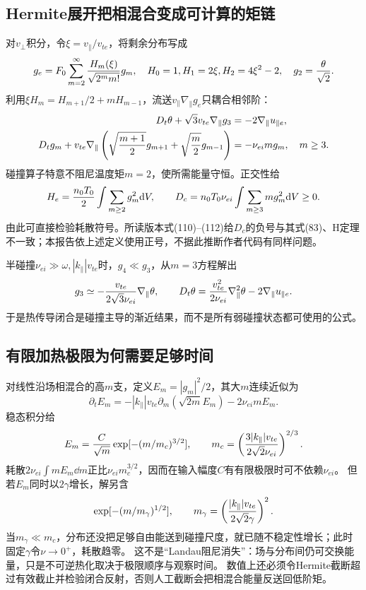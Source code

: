 \documentclass[UTF8,a4paper,11pt,openany,fontset=fandol]{ctexbook}
\begin{document}
\subsection{Hermite展开把相混合变成可计算的矩链}
对$v_\perp$积分，令$\xi=v_\parallel/v_{te}$，将剩余分布写成
\begin{equation}
 g_e=F_0\sum_{m=2}^{\infty}{H_m(\xi)\over\sqrt{2^m m!}}g_m,
 \quad H_0=1, H_1=2\xi, H_2=4\xi^2-2,\quad g_2={\theta\over\sqrt2}.
\end{equation}
利用$\xi H_m=H_{m+1}/2+mH_{m-1}$，流送$v_\parallel\nabla_\parallel g_e$只耦合相邻阶：
\begin{align}
 D_t\theta+\sqrt3v_{te}\nabla_\parallel g_3&=-2\nabla_\parallel u_{\parallel e},\\
 D_tg_m+v_{te}\nabla_\parallel\left(\sqrt{{m+1\over2}}g_{m+1}
 +\sqrt{{m\over2}}g_{m-1}\right)&=-\nu_{ei}m g_m,\quad m\ge3.
\end{align}
碰撞算子特意不阻尼温度矩$m=2$，使所需能量守恒。正交性给
\begin{equation}
 H_e={n_0T_0\over2}\int\sum_{m\ge2}g_m^2\mathrm d V,\qquad
 D_c=n_0T_0\nu_{ei}\int\sum_{m\ge3}m g_m^2\mathrm d V\ge0.
\end{equation}
由此可直接检验耗散符号。所读版本式(110)--(112)给$D_c$的负号与其式(83)、H定理不一致；本报告依上述定义使用正号，不据此推断作者代码有同样问题。

半碰撞$\nu_{ei}\gg\omega,|k_\parallel|v_{te}$时，$g_4\ll g_3$，从$m=3$方程解出
\begin{equation}
 g_3\simeq-{v_{te}\over2\sqrt3\nu_{ei}}\nabla_\parallel\theta,\qquad
 D_t\theta={v_{te}^2\over2\nu_{ei}}\nabla_\parallel^2\theta-2\nabla_\parallel u_{\parallel e}.
\end{equation}
于是热传导闭合是碰撞主导的渐近结果，而不是所有弱碰撞状态都可使用的公式。

\subsection{有限加热极限为何需要足够时间}
对线性沿场相混合的高$m$支，定义$E_m=|g_m|^2/2$，其大$m$连续近似为
\begin{equation}
 \partial_tE_m=-|k_\parallel|v_{te}\partial_m(\sqrt{2m}E_m)-2\nu_{ei}mE_m.
\end{equation}
稳态积分给
\begin{equation}
 E_m={C\over\sqrt m}\exp[-(m/m_c)^{3/2}],\qquad
 m_c=\left({3|k_\parallel|v_{te}\over2\sqrt2\nu_{ei}}\right)^{2/3}.
\end{equation}
耗散$2\nu_{ei}\int mE_m\dd m$正比$\nu_{ei}m_c^{3/2}$，因而在输入幅度$C$有有限极限时可不依赖$\nu_{ei}$。
但若$E_m$同时以$2\gamma$增长，解另含
\begin{equation}
 \exp[-(m/m_\gamma)^{1/2}],\qquad
 m_\gamma=\left({|k_\parallel|v_{te}\over2\sqrt2\gamma}\right)^2.
\end{equation}
当$m_\gamma\ll m_c$，分布还没把足够自由能送到碰撞尺度，就已随不稳定性增长；此时固定$\gamma$令$\nu\to0^+$，耗散趋零。
这不是“Landau阻尼消失”：场与分布间仍可交换能量，只是不可逆热化取决于极限顺序与观察时间。
数值上还必须令Hermite截断超过有效截止并检验闭合反射，否则人工截断会把相混合能量反送回低阶矩。
\end{document}
